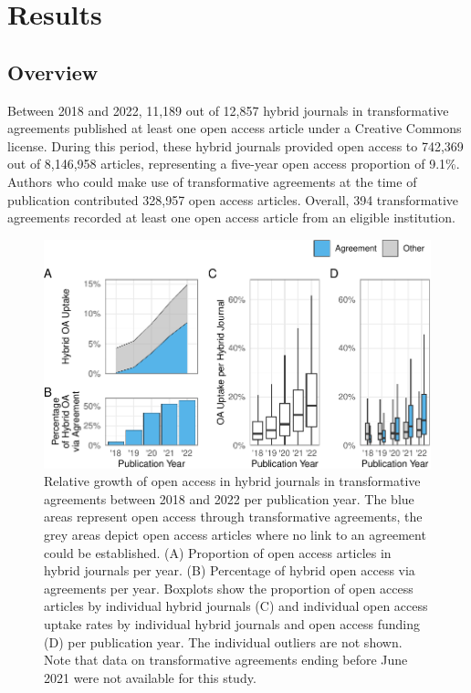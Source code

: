 \documentclass[a4paper,man,floatsintext,longtable,noextraspace,12pt]{apa6}
\begin{document}
\hypertarget{results}{%
\section{Results}\label{results}}

\hypertarget{overview}{%
\subsection{Overview}\label{overview}}

Between 2018 and 2022, 11,189 out of 12,857 hybrid journals in
transformative agreements published at least one open access article
under a Creative Commons license. During this period, these hybrid
journals provided open access to 742,369 out of 8,146,958 articles,
representing a five-year open access proportion of 9.1\%. Authors who
could make use of transformative agreements at the time of publication
contributed 328,957 open access articles. Overall, 394 transformative
agreements recorded at least one open access article from an eligible
institution.

\begin{figure}[ht!]

{\centering \includegraphics[width=0.99\linewidth,]{fig/results_overview-1} 

}

\caption{Relative growth of open access in hybrid journals in transformative agreements between 2018 and 2022 per publication year. The blue areas represent open access through transformative agreements, the grey areas depict open access articles where no link to an agreement could be established. (A) Proportion of open access articles in hybrid journals per year. (B) Percentage of hybrid open access via agreements per year. Boxplots show the proportion of open access articles by individual hybrid journals (C) and individual open access uptake rates by individual hybrid journals and open access funding (D) per publication year. The individual outliers are not shown. Note that data on transformative agreements ending before June 2021 were not available for this study.}\label{fig:results_overview}
\end{figure}
\end{document}
